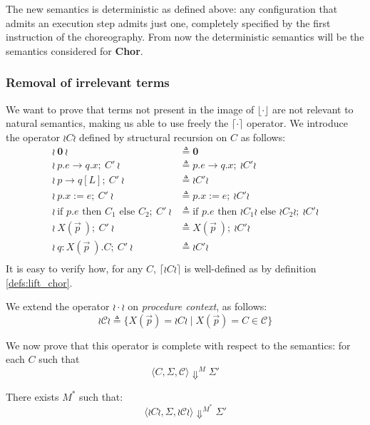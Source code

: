 \documentclass[12pt,a4paper,twoside]{book}
\begin{document}
The new semantics is deterministic as defined above: any configuration that admits an execution step admits just one, completely specified by the first instruction of the choreography. From now the deterministic semantics will be the semantics considered for \textbf{Chor}.

\subsubsection{Removal of irrelevant terms}
We want to prove that terms not present in the image of $\lfloor \cdot \rfloor$ are not relevant to natural semantics, making us able to use freely the $\lceil \cdot \rceil$ operator. We introduce the operator $\wr C \wr$ defined by structural recursion on $C$ as follows:
\begin{align*}
	\wr~\boldsymbol{0}~\wr &\triangleq \boldsymbol{0} \\
	\wr~p.e \rightarrow q.x;~ C'~\wr &\triangleq p.e \rightarrow q.x;~ \wr C' \wr \\
	\wr~p \rightarrow q[L];~ C'~\wr &\triangleq \wr C' \wr \\
	\wr~p.x := e;~ C'~\wr &\triangleq p.x := e;~ \wr C' \wr \\
	\wr~\text{if } p.e \text{ then } C_1 \text{ else } C_2;~ C'~\wr &\triangleq \text{if } p.e \text{ then } \wr C_1\wr \text{ else } \wr C_2\wr ;~ \wr C'\wr \\
	\wr~X(\vec{p}~);~ C'~\wr &\triangleq X(\vec{p}~);~ \wr C' \wr \\
	\wr~q : X(\vec{p}~).C;~ C'~\wr &\triangleq \wr C' \wr \\
\end{align*}
It is easy to verify how, for any $C$, $\lceil \wr C \wr \rceil$ is well-defined as by definition \ref{defs:lift_chor}.

We extend the operator $\wr \cdot \wr$ on \emph{procedure context}, as follows:
$$
\wr\mathscr{C}\wr \triangleq
\{X(\vec{p}) = \wr C \wr \mid X(\vec{p}) = C \in \mathscr{C}\}
$$

We now prove that this operator is complete with respect to the semantics: for each $C$ such that
$$
\langle C, \Sigma, \mathscr{C} \rangle \Downarrow^M \Sigma'
$$

There exists $M^*$ such that:
\begin{equation}
\label{aux:compl_wr}
	\langle \wr C \wr, \Sigma, \wr\mathscr{C}\wr \rangle \Downarrow^{M^*} \Sigma'
\end{equation}
\end{document}

